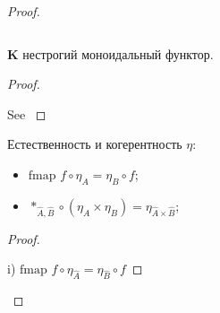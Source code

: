 \begin{proof}
\begin{prooftree}
\end{prooftree}

\begin{lemma}
  $ $

  {\bf K} нестрогий моноидальный функтор.
\end{lemma}

\begin{proof}
$ $

See \cite{ModalK}
\end{proof}

\begin{lemma} Естественность и когерентность $\eta$:

\begin{itemize}
  \item $\text{fmap } f \circ \eta_A = \eta_B \circ f$;
  \item $\ast_{\hat{A},\hat{B}} \circ (\eta_{A} \times \eta_{B}) = \eta_{\hat{A} \times \hat{B}}$;
\end{itemize}
\end{lemma}

\begin{proof}
  $ $

  i) $\text{fmap } f \circ \eta_{\hat{A}} = \eta_{\hat{B}} \circ f$

\vspace{\baselineskip}


\end{proof}
\end{proof}
